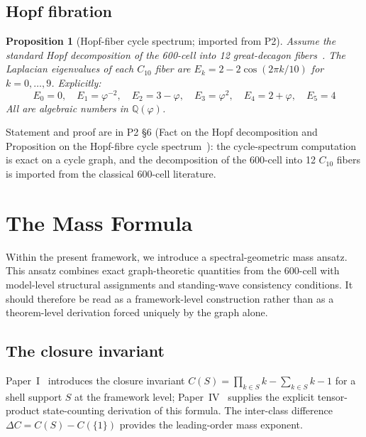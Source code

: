 \documentclass[12pt]{article}
\newtheorem{proposition}[theorem]{Proposition}
\newcommand{\phig}{\varphi}
\begin{document}
\subsection{Hopf fibration}

\begin{proposition}[Hopf-fiber cycle spectrum; imported from P2]\label{thm:hopf}
Assume the standard Hopf decomposition of the 600-cell into 12 great-decagon fibers~\citep{Coxeter1973, DescHopf600}. The Laplacian eigenvalues of each $C_{10}$ fiber are $E_k = 2 - 2\cos(2\pi k/10)$ for $k = 0, \ldots, 9$. Explicitly:
\[
E_0 = 0, \quad E_1 = \phig^{-2}, \quad E_2 = 3 - \phig, \quad E_3 = \phig^2, \quad E_4 = 2 + \phig, \quad E_5 = 4
\]
All are algebraic numbers in $\mathbb{Q}(\phig)$.
\end{proposition}

Statement and proof are in P2 \S 6 (Fact on the Hopf decomposition and Proposition on the Hopf-fibre cycle spectrum~\citep{CascadeAlgSubstrate}): the cycle-spectrum computation is exact on a cycle graph, and the decomposition of the 600-cell into 12 $C_{10}$ fibers is imported from the classical 600-cell literature.

\section{The Mass Formula}\label{sec:formula}

Within the present framework, we introduce a spectral-geometric mass ansatz. This ansatz combines exact graph-theoretic quantities from the 600-cell with model-level structural assignments and standing-wave consistency conditions. It should therefore be read as a framework-level construction rather than as a theorem-level derivation forced uniquely by the graph alone.

\subsection{The closure invariant}

Paper~I~\citep{SmartI} introduces the closure invariant $C(S) = \prod_{k \in S} k - \sum_{k \in S} k - 1$ for a shell support $S$ at the framework level; Paper~IV~\citep{SmartIV} supplies the explicit tensor-product state-counting derivation of this formula. The inter-class difference $\Delta C = C(S) - C(\{1\})$ provides the leading-order mass exponent.
\end{document}
